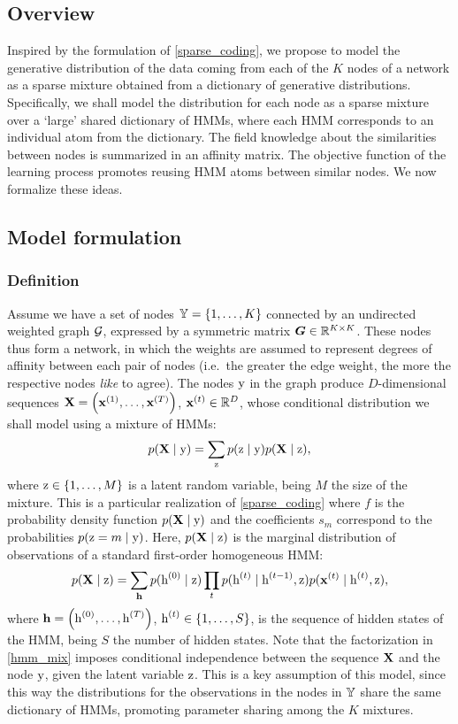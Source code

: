 \subsection{Overview}

Inspired by the formulation of \eqref{sparse_coding}, we propose to model the generative distribution of the data coming from each of the $K$ nodes of a network as a sparse mixture obtained from a dictionary of generative distributions. Specifically, we shall model the distribution for each node as a sparse mixture over a `large' shared dictionary of HMMs, where each HMM corresponds to an individual atom from the dictionary.
The field knowledge about the similarities between nodes is summarized in an affinity matrix. The objective function of the learning process promotes reusing HMM atoms between similar nodes.
We now formalize these ideas.

\subsection{Model formulation}
\subsubsection{Definition}
\label{sec:definition}
Assume we have a set of nodes ${\mathbb{Y}}=\{1, \dots, K\}$ connected by an undirected weighted graph ${\mathcal{G}}$, expressed by a symmetric matrix ${\bm{G}} \in \mathbb{R}^{K \times K}$. These nodes thus form a network, in which the weights are assumed to represent degrees of affinity between each pair of nodes (i.e.\ the greater the edge weight, the more the respective nodes \textit{like} to agree). The nodes ${\textnormal{y}}$ in the graph produce $D$-dimensional sequences ${\mathbf{X}} = \left({\mathbf{x}}^{(1)}, \dots,{\mathbf{x}}^{(T)} \right)$, ${\mathbf{x}}^{(t)} \in \mathbb{R}^D$, whose conditional distribution we shall model using a mixture of HMMs:
\begin{equation}
\label{hmm_mix}
p({\mathbf{X}} \mid {\textnormal{y}}) = \sum_{{\textnormal{z}}} p({\textnormal{z}}\mid{\textnormal{y}}) p({\mathbf{X}} \mid {\textnormal{z}}),
\end{equation}
where ${\textnormal{z}} \in \{1, \dots, M\}$ is a latent random variable, being $M$ the size of the mixture. This is a particular realization of \eqref{sparse_coding} where $f$ is the probability density function $p({\mathbf{X}} \mid {\textnormal{y}})$ and the coefficients $s_m$ correspond to the probabilities $p({\textnormal{z}} = m \mid {\textnormal{y}})$. Here, $p({\mathbf{X}} \mid {\textnormal{z}})$ is the marginal distribution of observations of a standard first-order homogeneous HMM:
\begin{equation}
\label{hmm}
p({\mathbf{X}} \mid {\textnormal{z}}) = \sum_{{\mathbf{h}}} p({\textnormal{h}}^{(0)}\mid{\textnormal{z}}) \prod_t p({\textnormal{h}}^{(t)}\mid{\textnormal{h}}^{(t-1)},{\textnormal{z}}) p({\mathbf{x}}^{(t)}\mid{\textnormal{h}}^{(t)},{\textnormal{z}}),
\end{equation}
where ${\mathbf{h}} = \left({\textnormal{h}}^{(0)}, \dots,{\textnormal{h}}^{(T)} \right)$, ${\textnormal{h}}^{(t)} \in \{1, \dots, S\}$, is the sequence of hidden states of the HMM, being $S$ the number of hidden states. Note that the factorization in \eqref{hmm_mix} imposes conditional independence between the sequence ${\mathbf{X}}$ and the node ${\textnormal{y}}$, given the latent variable ${\textnormal{z}}$. This is a key assumption of this model, since this way the distributions for the observations in the nodes in ${\mathbb{Y}}$ share the same dictionary of HMMs, promoting parameter sharing among the $K$ mixtures.

